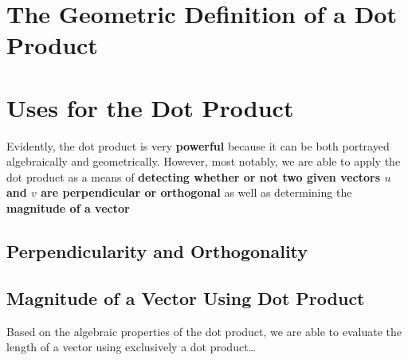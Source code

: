 \documentclass{report}
\begin{document}
\begin{sloppypar}
\section{The Geometric Definition of a Dot Product}
\begin{center}
\end{center}

\section{Uses for the Dot Product}
Evidently, the dot product is very \textbf{powerful}
because it can be both portrayed algebraically
and geometrically. However, most notably, we
are able to apply the dot product as a means
of \textbf{detecting whether or not two
  given vectors $ u $ and $ v $ are perpendicular
  or orthogonal} as well as determining the
\textbf{magnitude of a vector}

\subsection{Perpendicularity and Orthogonality}
\begin{center}
\end{center}

\subsection{Magnitude of a Vector Using Dot Product}
Based on the algebraic properties of the dot product,
we are able to evaluate the length of a vector
using exclusively a dot product\dots
\begin{center}
\end{center}
\end{sloppypar}
\end{document}
